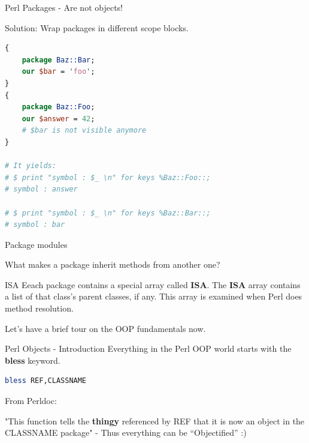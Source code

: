 \documentclass[10pt]{beamer}
\begin{document}
\begin{frame}[fragile]{Perl Packages - Are not objects!}

Solution: Wrap packages in different scope blocks.

\begin{lstlisting}[language=perl]
{
    package Baz::Bar;
    our $bar = 'foo';
}
{
    package Baz::Foo;
    our $answer = 42;
    # $bar is not visible anymore
}

# It yields:
# $ print "symbol : $_ \n" for keys %Baz::Foo::;
# symbol : answer

# $ print "symbol : $_ \n" for keys %Baz::Bar::;
# symbol : bar


\end{lstlisting}

\end{frame}


\begin{frame}{Package modules}

What makes a package inherit methods from another one?

\begin{alertblock}{ISA}
Eeach package contains a special array called \textbf{ISA}. The \textbf{ISA} array contains a list of that class's parent classes, if any. This array is examined when Perl does method resolution.
\end{alertblock}

Let's have a brief tour on the OOP fundamentals now.
\end{frame}

\begin{frame}[fragile]{Perl Objects - Introduction}
Everything in the Perl OOP world starts with the \textbf{bless} keyword.
\begin{lstlisting}[language=perl]
bless REF,CLASSNAME
\end{lstlisting}

From Perldoc:

"This function tells the \textbf{thingy} referenced by REF that it is now an object in the CLASSNAME package" - Thus everything can be ``Objectified'' :)

\end{frame}
\end{document}
